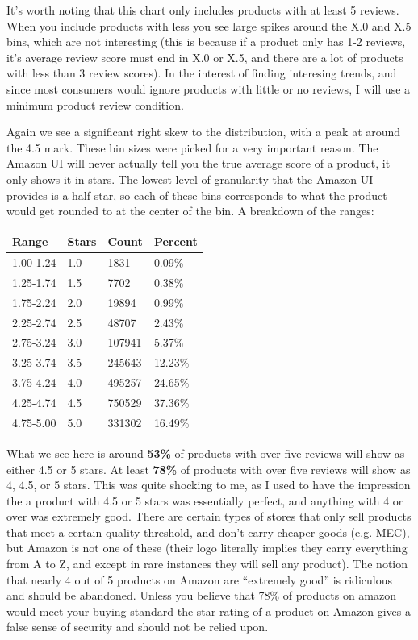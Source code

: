 \documentclass[a4paper,10pt]{article}
\begin{document}
It's worth noting that this chart only includes products with at least 5 reviews. When you include products with less you see large spikes around the X.0 and X.5 bins, which are not interesting (this is because if a product only has 1-2 reviews, it's average review score must end in X.0 or X.5, and there are a lot of products with less than 3 review scores). In the interest of finding interesing trends, and since most consumers would ignore products with little or no reviews, I will use a minimum product review condition.

Again we see a significant right skew to the distribution, with a peak at around the 4.5 mark. These bin sizes were picked for a very important reason. The Amazon UI will never actually tell you the true average score of a product, it only shows it in stars. The lowest level of granularity that the Amazon UI provides is a half star, so each of these bins corresponds to what the product would get rounded to at the center of the bin. A breakdown of the ranges:

\begin{center}
    \begin{tabular}{l l l l}
    \textbf{Range} & \textbf{Stars} & \textbf{Count} & \textbf{Percent} \\
    \hline
    1.00-1.24 & 1.0 & 1831      & 0.09\% \\
    1.25-1.74 & 1.5 & 7702      & 0.38\% \\
    1.75-2.24 & 2.0 & 19894     & 0.99\% \\
    2.25-2.74 & 2.5 & 48707     & 2.43\% \\
    2.75-3.24 & 3.0 & 107941    & 5.37\% \\
    3.25-3.74 & 3.5 & 245643    & 12.23\% \\
    3.75-4.24 & 4.0 & 495257    & 24.65\% \\
    4.25-4.74 & 4.5 & 750529    & 37.36\% \\
    4.75-5.00 & 5.0 & 331302    & 16.49\% \\
    \end{tabular}
\end{center}
What we see here is around \textbf{53\%} of products with over five reviews will show as either 4.5 or 5 stars. At least \textbf{78\%} of products with over five reviews will show as 4, 4.5, or 5 stars. This was quite shocking to me, as I used to have the impression the a product with 4.5 or 5 stars was essentially perfect, and anything with 4 or over was extremely good. There are certain types of stores that only sell products that meet a certain quality threshold, and don't carry cheaper goods (e.g. MEC), but Amazon is not one of these (their logo literally implies they carry everything from A to Z, and except in rare instances they will sell any product). The notion that nearly 4 out of 5 products on Amazon are \enquote{extremely good} is ridiculous and should be abandoned. Unless you believe that 78\% of products on amazon would meet your buying standard the star rating of a product on Amazon gives a false sense of security and should not be relied upon.
\end{document}
